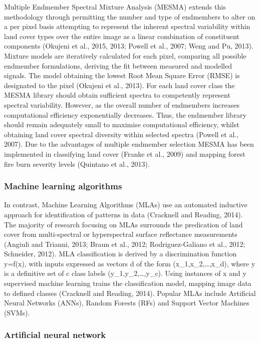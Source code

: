\documentclass[]{book}
\begin{document}
Multiple Endmember Spectral Mixture Analysis (MESMA) extends this
methodology through permitting the number and type of endmembers to
alter on a per pixel basis attempting to represent the inherent spectral
variability within land cover types over the entire image as a linear
combination of constituent components (Okujeni et al., 2015, 2013;
Powell et al., 2007; Weng and Pu, 2013). Mixture models are iteratively
calculated for each pixel, comparing all possible endmember
formulations, deriving the fit between measured and modelled signals.
The model obtaining the lowest Root Mean Square Error (RMSE) is
designated to the pixel (Okujeni et al., 2013). For each land cover
class the MESMA library should obtain sufficient spectra to competently
represent spectral variability. However, as the overall number of
endmembers increases computational efficiency exponentially decreases.
Thus, the endmember library should remain adequately small to maximise
computational efficiency, whilst obtaining land cover spectral diversity
within selected spectra (Powell et al., 2007). Due to the advantages of
multiple endmember selection MESMA has been implemented in classifying
land cover (Franke et al., 2009) and mapping forest fire burn severity
levels (Quintano et al., 2013).

\subsubsection{Machine learning
algorithms}\label{machine-learning-algorithms}

In contrast, Machine Learning Algorithms (MLAs) use an automated
inductive approach for identification of patterns in data (Cracknell and
Reading, 2014). The majority of research focusing on MLAs surrounds the
predication of land cover from multi-spectral or hyperspectral surface
reflectance measurements (Angiuli and Trianni, 2013; Braun et al., 2012;
Rodriguez-Galiano et al., 2012; Schneider, 2012). MLA classification is
derived by a discrimination function y=f(x), with inputs expressed as
vectors d of the form (x\_1,x\_2,\ldots{},x\_d), where y is a definitive
set of c class labels (y\_1,y\_2,\ldots{},y\_c). Using instances of x
and y supervised machine learning trains the classification model,
mapping image data to defined classes (Cracknell and Reading, 2014).
Popular MLAs include Artificial Neural Networks (ANNs), Random Forests
(RFs) and Support Vector Machines (SVMs).

\subsubsection{Artificial neural
network}\label{artificial-neural-network}
\end{document}
